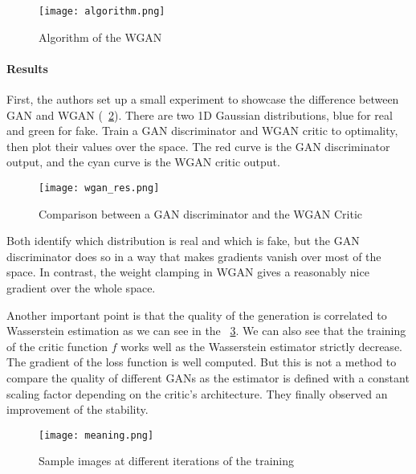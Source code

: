 \begin{figure}[t]
	\centering
	\texttt{[image: algorithm.png]}
	\caption{Algorithm of the WGAN}
	\label{algo}
\end{figure}

\paragraph{Results}
First, the authors set up a small experiment to showcase the difference
between GAN and WGAN (\figurename~\ref{compa}). There are two 1D Gaussian
distributions, blue for real and green for fake. Train a GAN discriminator and
WGAN critic to optimality, then plot their values over the space. The red curve
is the GAN discriminator output, and the cyan curve is the WGAN critic output.

\begin{figure}[h]
	\centering
	\texttt{[image: wgan\_res.png]}
	\caption{Comparison between a GAN discriminator and the WGAN Critic}
	\label{compa}
\end{figure}

Both identify which distribution is real and which is fake, but the GAN
discriminator does so in a way that makes gradients vanish over most of
the space. In contrast, the weight clamping in WGAN gives a reasonably nice
gradient over the whole space.

Another important point is that the quality of the generation is correlated
to Wasserstein estimation as we can see in the \figurename~\ref{meaning}. We
can also see that the training of the critic function $f$ works well as the
Wasserstein estimator strictly decrease. The gradient of the loss function is
well computed. But this is not a method to compare the quality of different
GANs as the estimator is defined with a constant scaling factor depending
on the critic's architecture. They finally observed an improvement of the
stability.

\begin{figure}
	\centering
	\texttt{[image: meaning.png]}
	\caption{Sample images at different iterations of the training}
	\label{meaning}
\end{figure}


